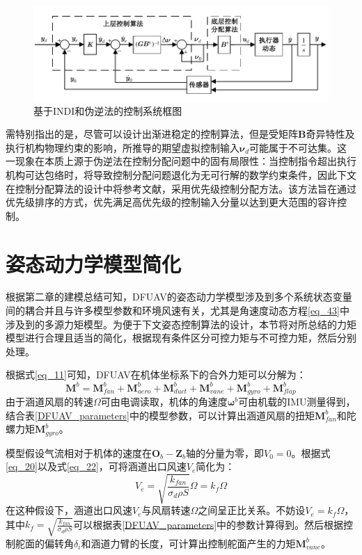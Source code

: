 \begin{figure}[htbp]
	\centering
	\begin{minipage}[c]{1\textwidth}
		\centering
		\includegraphics[scale=1]{Fig/理论框图.pdf}
		\caption{\label{理论框图}基于INDI和伪逆法的控制系统框图}
	\end{minipage}%
\end{figure}

需特别指出的是，尽管可以设计出渐进稳定的控制算法，但是受矩阵$\boldsymbol{B}$奇异特性及执行机构物理约束的影响，所推导的期望虚拟控制输入$\boldsymbol{\nu}_d$可能属于不可达集。这一现象在本质上源于伪逆法在控制分配问题中的固有局限性：当控制指令超出执行机构可达包络时，将导致控制分配问题退化为无可行解的数学约束条件，因此下文在控制分配算法的设计中将参考文献\parencite{HKXB202010026}，采用优先级控制分配方法。该方法旨在通过优先级排序的方式，优先满足高优先级的控制输入分量以达到更大范围的容许控制。

\section{姿态动力学模型简化}

根据第二章的建模总结可知，DFUAV的姿态动力学模型涉及到多个系统状态变量间的耦合并且与许多模型参数和环境风速有关，尤其是角速度动态方程\eqref{eq_43}中涉及到的多源力矩模型。为便于下文姿态控制算法的设计，本节将对所总结的力矩模型进行合理且适当的简化，根据现有条件区分可控力矩与不可控力矩，然后分别处理。

根据式\ref{eq_11}可知，DFUAV在机体坐标系下的合外力矩可以分解为：
\begin{equation}
    \boldsymbol{M}^b=\boldsymbol{M}_{fan}^b+\boldsymbol{M}_{aero}^b+\boldsymbol{M}_{duct}^b+\boldsymbol{M}_{vane}^b+\boldsymbol{M}_{gyro}^b+\boldsymbol{M}_{flap}^b
    \label{3-13}
\end{equation}
由于涵道风扇的转速$\Omega$可由电调读取，机体的角速度$\boldsymbol\omega^b$可由机载的IMU测量得到，结合表\ref{DFUAV_parameters}中的模型参数，可以计算出涵道风扇的扭矩$\boldsymbol{M}_{fan}^b$和陀螺力矩$\boldsymbol{M}_{gyro}^b$。

模型假设气流相对于机体的速度在$\boldsymbol{O}_b-\boldsymbol{Z}_b$轴的分量为零，即$V_0=0$。根据式\ref{eq_20}以及式\ref{eq_22}，可将涵道出口风速$V_{e}$简化为：
\begin{equation}
    V_e=\sqrt{\frac{k_{fan}}{\sigma_d\rho S}}\Omega={k_{f}}\Omega    \label{3-14}
\end{equation}
在这种假设下，涵道出口风速$V_{e}$与风扇转速$\Omega$之间呈正比关系。不妨设$V_e=k_{f}\Omega$，其中$k_{f}=\sqrt{\frac{k_{fan}}{\sigma_d\rho S}}$可以根据表\ref{DFUAV_parameters}中的参数计算得到。然后根据控制舵面的偏转角$\delta_{i}$和涵道力臂的长度，可计算出控制舵面产生的力矩$\boldsymbol{M}_{vane}^b$。

